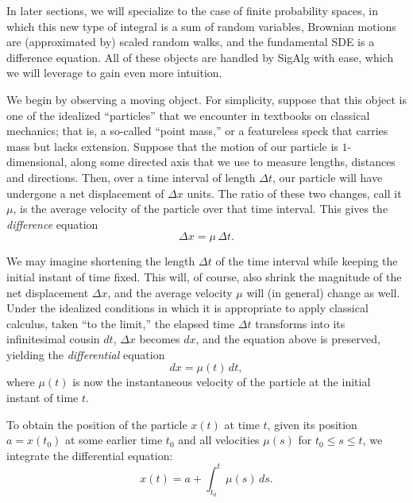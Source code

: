 \documentclass[11pt]{book}
\theoremstyle{definition}
\numberwithin{equation}{section}
\begin{document}
In later sections, we will specialize to the case of finite probability spaces, in which this new type of integral is a sum of random variables, Brownian motions are (approximated by) scaled random walks, and the fundamental SDE is a difference equation. All of these objects are handled by SigAlg with ease, which we will leverage to gain even more intuition.

We begin by observing a moving object. For simplicity, suppose that this object is one of the idealized ``particles'' that we encounter in textbooks on classical mechanics; that is, a so-called ``point mass,'' or a featureless speck that carries mass but lacks extension. Suppose that the motion of our particle is $1$-dimensional, along some directed axis that we use to measure lengths, distances and directions. Then, over a time interval of length $\Delta t$, our particle will have undergone a net displacement of $\Delta x$ units. The ratio of these two changes, call it $\mu$, is the average velocity of the particle over that time interval. This gives the \textit{difference} equation
\[
	\Delta x = \mu \, \Delta t.
\]

We may imagine shortening the length $\Delta t$ of the time interval while keeping the initial instant of time fixed. This will, of course, also shrink the magnitude of the net displacement $\Delta x$, and the average velocity $\mu$ will (in general) change as well. Under the idealized conditions in which it is appropriate to apply classical calculus, taken ``to the limit,'' the elapsed time $\Delta t$ transforms into its infinitesimal cousin $dt$, $\Delta x$ becomes $dx$, and the equation above is preserved, yielding the \textit{differential} equation
\begin{equation} \label{eqn:classic-diff-eq}
	dx = \mu(t) \, dt,
\end{equation}
where $\mu(t)$ is now the instantaneous velocity of the particle at the initial instant of time $t$.

To obtain the position of the particle $x(t)$ at time $t$, given its position $a = x(t_0)$ at some earlier time $t_0$ and all velocities $\mu(s)$ for $t_0 \leq s \leq t$, we integrate the differential equation:
\[
	x(t) = a + \int_{t_0}^t \mu(s) \, ds.
\]
\end{document}
